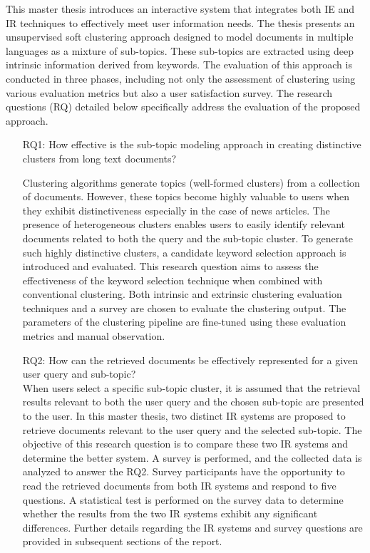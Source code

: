 This master thesis introduces an interactive system that integrates both \ac{IE} and \ac{IR} techniques to effectively meet user information needs. The thesis presents an unsupervised soft clustering approach designed to model documents in multiple languages as a mixture of sub-topics. These sub-topics are extracted using deep intrinsic information derived from keywords. The evaluation of this approach is conducted in three phases, including not only the assessment of clustering using various evaluation metrics but also a user satisfaction survey. The research questions (RQ) detailed below specifically address the evaluation of the proposed approach.

\begin{enumerate}
\item[RQ1:] How effective is the sub-topic modeling approach in creating distinctive clusters from long text documents?

Clustering algorithms generate topics (well-formed clusters) from a collection of documents. However, these topics become highly valuable to users when they exhibit distinctiveness especially in the case of news articles. The presence of heterogeneous clusters enables users to easily identify relevant documents related to both the query and the sub-topic cluster. To generate such highly distinctive clusters, a candidate keyword selection approach is introduced and evaluated. This research question aims to assess the effectiveness of the keyword selection technique when combined with conventional clustering. Both intrinsic and extrinsic clustering evaluation techniques and a survey are chosen to evaluate the clustering output. The parameters of the clustering pipeline are fine-tuned using these evaluation metrics and manual observation.



\item[RQ2:] How can the retrieved documents be effectively represented for a given user query and sub-topic?  \\

When users select a specific sub-topic cluster, it is assumed that the retrieval results relevant to both the user query and the chosen sub-topic are presented to the user. In this master thesis, two distinct  \ac{IR} systems are proposed to retrieve documents relevant to the user query and the selected sub-topic. The objective of this research question is to compare these two \ac{IR} systems and determine the better system. A survey is performed, and the collected data is analyzed to answer the RQ2. Survey participants have the opportunity to read the retrieved documents from both \ac{IR} systems and respond to five questions. A statistical test is performed on the survey data to determine whether the results from the two \ac{IR} systems exhibit any significant differences. Further details regarding the  \ac{IR} systems and survey questions are provided in subsequent sections of the report.



\end{enumerate}
